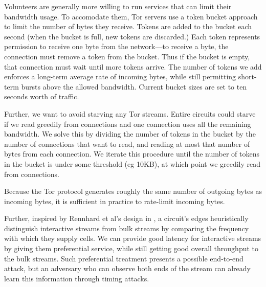 \documentclass[times,10pt,twocolumn]{article}
\begin{document}

Volunteers are generally more willing to run services that can limit
their bandwidth usage.  To accomodate them, Tor servers use a token
bucket approach to limit the number of bytes they
receive. Tokens are added to the bucket each second (when the bucket is
full, new tokens are discarded.) Each token represents permission to
receive one byte from the network---to receive a byte, the connection
must remove a token from the bucket. Thus if the bucket is empty, that
connection must wait until more tokens arrive. The number of tokens we
add enforces a long-term average rate of incoming bytes, while still
permitting short-term bursts above the allowed bandwidth. Current bucket
sizes are set to ten seconds worth of traffic.

Further, we want to avoid starving any Tor streams. Entire circuits
could starve if we read greedily from connections and one connection
uses all the remaining bandwidth. We solve this by dividing the number
of tokens in the bucket by the number of connections that want to read,
and reading at most that number of bytes from each connection. We iterate
this procedure until the number of tokens in the bucket is under some
threshold (eg 10KB), at which point we greedily read from connections.

Because the Tor protocol generates roughly the same number of outgoing
bytes as incoming bytes, it is sufficient in practice to rate-limit
incoming bytes.

Further, inspired by Rennhard et al's design in \cite{anonnet}, a
circuit's edges heuristically distinguish interactive streams from bulk
streams by comparing the frequency with which they supply cells.  We can
provide good latency for interactive streams by giving them preferential
service, while still getting good overall throughput to the bulk
streams. Such preferential treatment presents a possible end-to-end
attack, but an adversary who can observe both
ends of the stream can already learn this information through timing
attacks.

\label{subsec:congestion}
\end{document}
